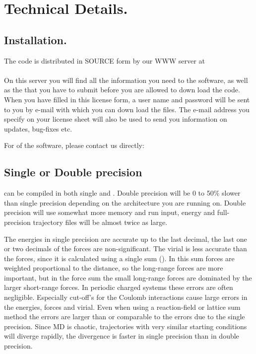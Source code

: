 \chapter{Technical Details.}
\label{ch:install}
\section{Installation.}
The {\gromacs} code is distributed in SOURCE form by our WWW server at\\
{\wwwpage}\\
On this server you will find all the information you need to 
the software, as well as the  that you have to submit
before you are allowed to down load the code. When you have filled in this
license form, a user name and password will be sent to you by e-mail
with which you can down load the files. The e-mail address you specify
on your license sheet will also be used to send you information on
updates, bug-fixes etc.

For  of the software, please contact us
directly: {\email}

\section{Single or Double precision}
{\gromacs} can be compiled in both single
and .
Double precision will be 0 to 50\% slower than single precision depending
on the architecture you are running on. Double precision will use somewhat more
memory and run input, energy and full-precision trajectory files will be
almost twice as large.

The energies in single precision are accurate up to the last decimal,
the last one or two decimals of the forces are non-significant.
The virial is less accurate than the forces, since it is calculated
using a single sum ().
In this sum forces are weighted proportional to the distance, so the long-range
forces are more important, but in the force sum the small long-range forces
are dominated by the larger short-range forces.
In periodic charged systems these errors are often negligible.
Especially cut-off's for the Coulomb interactions cause large errors
in the energies, forces and virial.
Even when using a reaction-field or lattice sum method the errors
are larger than or comparable to the errors due to the single precision.
Since MD is chaotic, trajectories with very similar starting conditions will
diverge rapidly, the divergence is faster in single precision than in double
precision.

